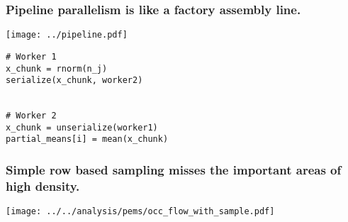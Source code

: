 \documentclass{beamer}
\begin{document}
\begin{frame}[fragile]

    \frametitle{Pipeline parallelism is like a factory assembly line.}

\centerline{\texttt{[image: ../pipeline.pdf]}}

\begin{verbatim}
# Worker 1
x_chunk = rnorm(n_j)
serialize(x_chunk, worker2)


# Worker 2
x_chunk = unserialize(worker1)
partial_means[i] = mean(x_chunk)
\end{verbatim}

\end{frame}
\begin{frame}

    \frametitle{Simple row based sampling misses the important areas of high
    density.}

    \centerline{\texttt{[image: ../../analysis/pems/occ\_flow\_with\_sample.pdf]}}



\end{frame}
\end{document}
